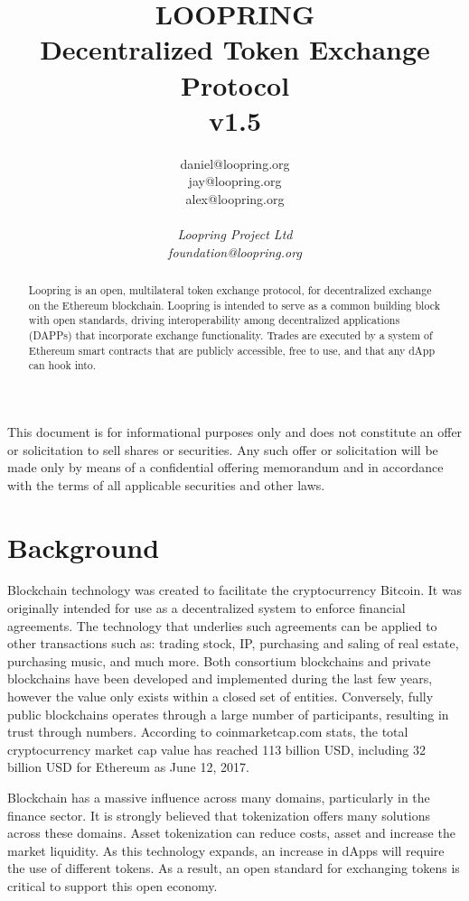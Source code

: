 \documentclass[UTF8,nofonts]{article}
\title{\textbf{LOOPRING}\\\textbf{Decentralized Token Exchange Protocol}\\v1.5}
\author{
  daniel@loopring.org\\
  jay@loopring.org\\
  alex@loopring.org\\ 
  \\
  \textit{Loopring Project Ltd}\\
  \textit{foundation@loopring.org}\\
 }
\begin{document}
\maketitle
This document is for informational purposes only and does not constitute an offer or solicitation to sell shares or securities. Any such offer or solicitation will be made only by means of a confidential offering memorandum and in accordance with the terms of all applicable securities and other laws.



\begin{abstract}
Loopring is an open, multilateral token exchange protocol, for decentralized exchange on the Ethereum blockchain. Loopring is intended to serve as a common building block with open standards, driving interoperability among decentralized applications (DAPPs) that incorporate exchange functionality. Trades are executed by a system of Ethereum smart contracts that are publicly accessible, free to use, and that any dApp can hook into.
\end{abstract}

\newpage

\tableofcontents
\newpage

\section{Background\label{sec: background}}

Blockchain\cite{staff2016blockchains}\cite{swan2015blockchain} technology was created to facilitate the cryptocurrency Bitcoin\cite{nakamoto2008Bitcoin}. It was originally intended for use as a decentralized system to enforce financial agreements\cite{lamport1982byzantine}\cite{christidis2016blockchains}. The technology that underlies such agreements can be applied to other transactions such as: trading stock, IP, purchasing and saling of real estate, purchasing music, and much more. Both consortium blockchains and private blockchains have been developed and implemented during the last few years, however the value only exists within a closed set of entities. Conversely, fully public blockchains operates through a large number of participants, resulting in trust through numbers. According to coinmarketcap.com stats, the total cryptocurrency market cap value has reached 113 billion USD,  including 32 billion USD for Ethereum\cite{wood2014ethereum} as June 12, 2017.

Blockchain has a massive influence across many domains,  particularly in the finance sector. It is strongly believed that tokenization\cite{liu2016medical}\cite{christidis2016blockchains}\cite{swan2015blockchain} offers many solutions across these domains. Asset tokenization can reduce costs, asset and increase the market liquidity. As this technology expands, an increase in dApps will require the use of different tokens. As a result, an open standard for exchanging tokens is critical to support this open economy.
\end{document}
